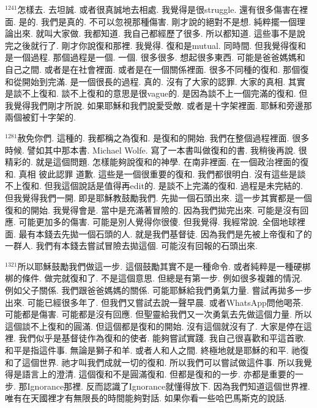 \documentclass{book}
\begin{document}
$^{1241}$怎樣去.
去坦誠.
或者很真誠地去相處.
我覺得是很struggle.
還有很多傷害在裡面.
是的.
我們是真的.
不可以忽視那種傷害.
剛才說的絕對不是想.
純粹擺一個理論出來.
就叫大家做.
我都知道.
我自己都經歷了很多.
所以都知道.
這些事不是說完之後就行了.
剛才你說復和那裡.
我覺得.
復和是mutual.
同時間.
但我覺得復和是一個過程.
那個過程是一個.
一個.
很多很多.
想起很多東西.
可能是爸爸媽媽和自己之間.
或者是在社會裡面.
或者是在一個關係裡面.
很多不同種的復和.
那個復和從開始到完滿.
是一個很長的過程.
真的.
沒有了大家的認罪.
大家的真相.
其實是談不上復和.
談不上復和的意思是很vague的.
是因為談不上一個完滿的復和.
但我覺得我們剛才所說.
如果耶穌和我們說愛受敵.
或者是十字架裡面.
耶穌和旁邊那兩個被釘十字架的.

$^{1281}$赦免你們.
這種的.
我都稱之為復和.
是復和的開始.
我們在整個過程裡面.
很多時候.
譬如其中那本書.
Michael Wolfe.
寫了一本書叫做復和的書.
我稍後再說.
很精彩的.
就是這個問題.
怎樣能夠說復和的神學.
在南非裡面.
在一個政治裡面的復和.
真相 彼此認罪 道歉.
這些是一個很重要的復和.
我們都很明白.
沒有這些是談不上復和.
但我這個說話是值得再edit的.
是談不上完滿的復和.
過程是未完結的.
但我覺得我們一開.
即是耶穌教鼓勵我們.
先拋一個石頭出來.
這一步其實都是一個復和的開始.
我覺得會是.
當中是充滿著冒險的.
因為我們拋完出來.
可能是沒有回應.
可能更加多的傷害.
可能是別人覺得你很傻.
但我覺得.
我經常說.
全個地球裡面.
最有本錢去先拋一個石頭的人.
就是我們基督徒.
因為我們是先被上帝復和了的一群人.
我們有本錢去嘗試冒險去拋這個.
可能沒有回報的石頭出來.

$^{1321}$所以耶穌鼓勵我們做這一步.
這個鼓勵其實不是一種命令.
或者純粹是一種硬梆梆的條件.
做完就復和了.
不是這個意思.
但總是有第一步.
例如很多複雜的情況.
例如父子關係.
我們跟爸爸媽媽的關係.
可能耶穌給我們勇氣力量.
嘗試再拋多一步出來.
可能已經很多年了.
但我們又嘗試去說一聲早晨.
或者WhatsApp問他喝茶.
可能都是傷害.
可能都是沒有回應.
但聖靈給我們又一次勇氣去先做這個力量.
所以這個談不上復和的圓滿.
但這個都是復和的開始.
沒有這個就沒有了.
大家是停在這裡.
我們似乎是基督徒作為復和的使者.
能夠嘗試實踐.
我自己很喜歡和平這首歌.
和平是指這件事.
無論是獅子和羊.
或者人和人之間.
終極地就是耶穌的和平.
祂復和了這個世界.
祂才叫我們成就一切的復和.
所以我們可以嘗試做這件事.
所以我覺得是語言上的澄清.
這個復和不是圓滿復和.
但都是復和的一步.
亦都是重要的一步.
那Ignorance那裡.
反而認識了Ignorance就懂得放下.
因為我們知道這個世界裡.
唯有在天國裡才有無限長的時間能夠對話.
如果你看一些哈巴馬斯克的說話.
\end{document}
